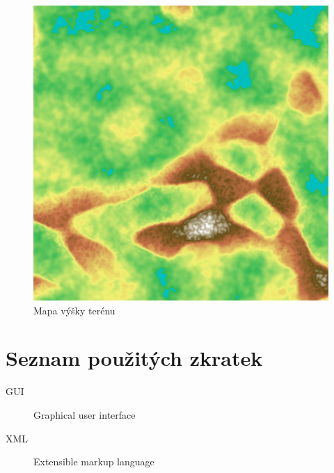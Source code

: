 \documentclass[thesis=M,czech]{FITthesis}[2019/12/23]
\begin{document}
\begin{figure}\centering
	\includegraphics[width=\textwidth]{images/world_gen/height}
	\caption[Mapa výšky terénu]{Mapa výšky terénu}\label{fig:height}
\end{figure}


\begin{conclusion}
\end{conclusion}




\appendix

\chapter{Seznam použitých zkratek}
\begin{description}
	\item[GUI] Graphical user interface
	\item[XML] Extensible markup language
\end{description}
\end{document}
